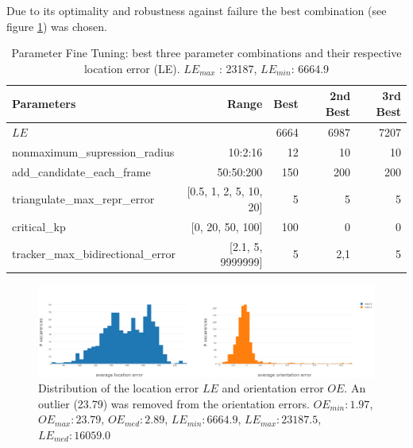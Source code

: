 \medskip

Due to its optimality and robustness against failure the best combination (see figure \ref{table:significant-param-tuning}) was chosen.

\begin{table}[htp]
	\centering
	\caption{Parameter Fine Tuning: best three parameter combinations and their respective location error (LE). $LE_{max}$ : 23187, $LE_{min}$: 6664.9}
	\label{table:significant-param-tuning}
	\begin{tabular}{lrrrr}
		\hline
		\textbf{Parameters}                &         \textbf{Range} & \textbf{Best} & \textbf{2nd Best} & \textbf{3rd Best} \\ \hline
		$LE$                &                        &          6664 &              6987 &              7207 \\ \hline\hline
		nonmaximum\_supression\_radius     &                10:2:16 &            12 &                10 &                10 \\ \hline
		add\_candidate\_each\_frame        &              50:50:200 &           150 &               200 &               200 \\ \hline
		triangulate\_max\_repr\_error      & [0.5, 1, 2, 5, 10, 20] &             5 &                 5 &                 5 \\ \hline
		critical\_kp                       &       [0, 20, 50, 100] &           100 &                 0 &                 0 \\ \hline
		tracker\_max\_bidirectional\_error &      [2.1, 5, 9999999] &             5 &               2,1 &                 5 \\ \hline
	\end{tabular}
\end{table}

\begin{figure}[htp]
	\centering
	\includegraphics[width=1\textwidth]{figures/error_histogram}
	\caption{Distribution of the location error $LE$ and orientation error $OE$. 
	An outlier (23.79) was removed from the orientation errors. 
		$OE_{min}: 1.97$, 
		$OE_{max}: 23.79$,
		$OE_{med}: 2.89$,
		$LE_{min}: 6664.9$,
		$LE_{max}: 23187.5$,
		$LE_{med}: 16059.0$}
	\label{fig:error_histogram}
\end{figure}

